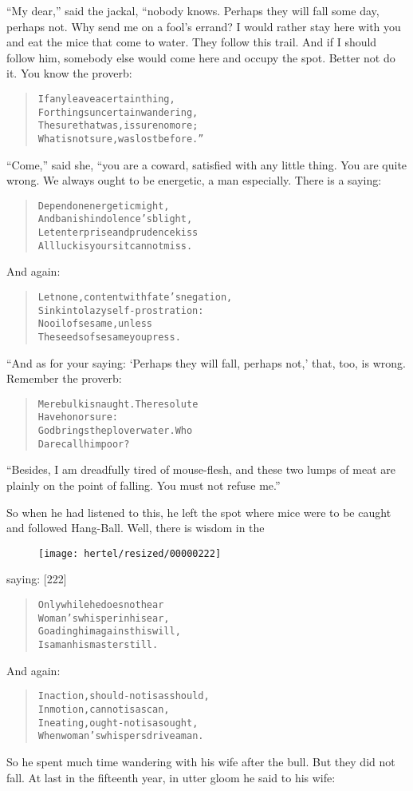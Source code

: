 \documentclass[article, twoside, 10pt]{memoir}
\renewenvironment{verbatim}{%
\begin{quote}%
\vskip -10pt%
\begin{alltt}\normalfont\small}{\end{alltt}%
\end{quote}%
\vskip -10pt
} %
\begin{document}
``My dear,'' said the jackal, “nobody knows. Perhaps they will fall
some day, perhaps not. Why send me on a fool's errand? I would
rather stay here with you and eat the mice that come to water. They
follow this trail. And if I should follow him, somebody else would
come here and occupy the spot. Better not do it. You know the
proverb:

\begin{verbatim}
If any leave a certain thing,
For things uncertain wandering,
The sure that was, is sure no more;
What is not sure, was lost before.”
\end{verbatim}
``Come,'' said she, “you are a coward, satisfied with any little
thing. You are quite wrong. We always ought to be energetic, a man
especially. There is a saying:

\begin{verbatim}
Depend on energetic might,
And banish indolence's blight,
Let enterprise and prudence kiss{\textemdash}
All luck is yours{\textemdash}it cannot miss.
\end{verbatim}
And again:

\begin{verbatim}
Let none, content with fate's negation,
Sink into lazy self-prostration:
No oil of sesame, unless
The seeds of sesame you press.
\end{verbatim}
“And as for your saying: `Perhaps they will fall, perhaps not,'
that, too, is wrong. Remember the proverb:

\begin{verbatim}
Mere bulk is naught. The resolute
    Have honor sure:
God brings the plover water. Who
    Dare call him poor?
\end{verbatim}
``Besides, I am dreadfully tired of mouse-flesh, and these two lumps of meat are plainly on the point of falling. You must not refuse me.''

So when he had listened to this, he left the spot where mice were
to be caught and followed Hang-Ball. Well, there is wisdom in the
\begin{figure}[p]\texttt{[image: hertel/resized/00000222]}\end{figure}saying: [222]

\begin{verbatim}
Only while he does not hear
Woman's whisper in his ear,
Goading him against his will,
Is a man his master still.
\end{verbatim}
And again:

\begin{verbatim}
In action, should-not is as should,
    In motion, cannot is as can,
In eating, ought-not is as ought,
    When woman's whispers drive a man.
\end{verbatim}
So he spent much time wandering with his wife after the bull. But
they did not fall. At last in the fifteenth year, in utter gloom he
said to his wife:
\end{document}

